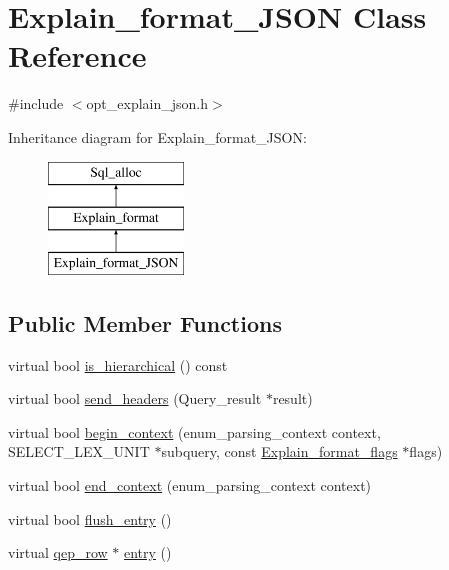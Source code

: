 \hypertarget{classExplain__format__JSON}{}\section{Explain\+\_\+format\+\_\+\+J\+S\+ON Class Reference}
\label{classExplain__format__JSON}


{\ttfamily \#include $<$opt\+\_\+explain\+\_\+json.\+h$>$}

Inheritance diagram for Explain\+\_\+format\+\_\+\+J\+S\+ON\+:\begin{figure}[H]
\begin{center}
\leavevmode
\includegraphics[height=3.000000cm]{classExplain__format__JSON}
\end{center}
\end{figure}
\subsection*{Public Member Functions}
\begin{DoxyCompactItemize}
\item 
virtual bool \mbox{\hyperlink{classExplain__format__JSON_a5df8ad340d44c6d184be5f6397ab8d99}{is\+\_\+hierarchical}} () const
\item 
virtual bool \mbox{\hyperlink{classExplain__format__JSON_a66a631eb1439d85e5616b86bbbddc923}{send\+\_\+headers}} (Query\+\_\+result $\ast$result)
\item 
virtual bool \mbox{\hyperlink{classExplain__format__JSON_a3de95e88857de347b30c13ca519c757f}{begin\+\_\+context}} (enum\+\_\+parsing\+\_\+context context, S\+E\+L\+E\+C\+T\+\_\+\+L\+E\+X\+\_\+\+U\+N\+IT $\ast$subquery, const \mbox{\hyperlink{classExplain__format__flags}{Explain\+\_\+format\+\_\+flags}} $\ast$flags)
\item 
virtual bool \mbox{\hyperlink{classExplain__format__JSON_a6b44f355df4e59b3d33b6c334d8fda59}{end\+\_\+context}} (enum\+\_\+parsing\+\_\+context context)
\item 
virtual bool \mbox{\hyperlink{classExplain__format__JSON_adf08f2f20ae05ca772a621f6139be6aa}{flush\+\_\+entry}} ()
\item 
virtual \mbox{\hyperlink{classqep__row}{qep\+\_\+row}} $\ast$ \mbox{\hyperlink{classExplain__format__JSON_ab1c4bc5ad6055507a47057fe98ba55dc}{entry}} ()
\end{DoxyCompactItemize}
